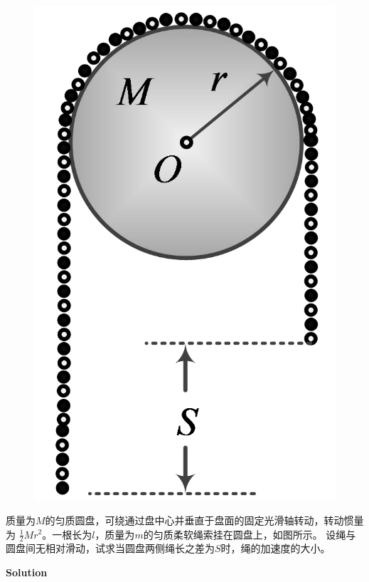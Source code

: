 \documentclass[12pt, a4paper]{article}
\numberwithin{equation}{section}
\begin{document}
    \begin{figure}
        \centering
        \includegraphics[scale=0.2]{"Chapter 04 images/pic7.png"}
        \label{pic4-7}
    \end{figure}

    质量为\(M\)的匀质圆盘，可绕通过盘中心并垂直于盘面的固定光滑轴转动，转动惯量为
    \(\frac{1}{2}Mr^2\)。一根长为\(l\)，质量为\(m\)的匀质柔软绳索挂在圆盘上，如图所示。
    设绳与圆盘间无相对滑动，试求当圆盘两侧绳长之差为\(S\)时，绳的加速度的大小。
    \vspace{1em}

    \textbf{Solution}
    \vspace{1em}
\end{document}
